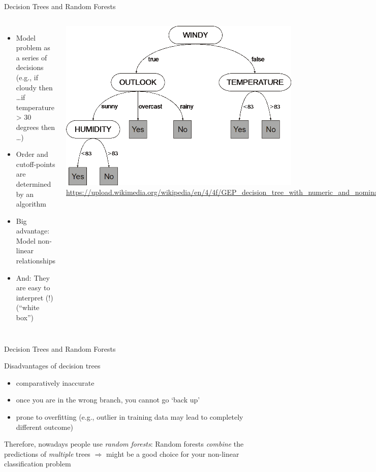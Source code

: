 \documentclass[compress]{beamer}
\begin{document}
\begin{frame}{Decision Trees and Random Forests}
	\begin{columns}
		\begin{itemize}[<+->]
			\item Model problem as a series of decisions (e.g., if cloudy then \ldots if temperature > 30 degrees then \ldots)
			\item Order and cutoff-points are determined by an algorithm
			\item Big advantage: Model non-linear relationships
			\item And: They are easy to interpret (!) (``white box'')
		\end{itemize}
		\includegraphics[width=.8\linewidth,height=.5\paperheight,keepaspectratio]{../pictures/decisiontree}
		\tiny{\url{https://upload.wikimedia.org/wikipedia/en/4/4f/GEP\_decision\_tree\_with\_numeric\_and\_nominal\_attributes.png}}
	\end{columns}
\end{frame}
\begin{frame}{Decision Trees and Random Forests}
	\begin{block}{Disadvantages of decision trees}
		\begin{itemize}
			\item comparatively inaccurate
			\item once you are in the wrong branch, you cannot go `back up'
			\item prone to overfitting (e.g., outlier in training data may lead to completely different outcome)
		\end{itemize}
	\end{block}
	\pause
	Therefore, nowadays people use \emph{random forests}: Random forests \emph{combine} the predictions of \emph{multiple} trees
	$\Rightarrow$ might be a good choice for your non-linear classification problem
\end{frame}
\end{document}
